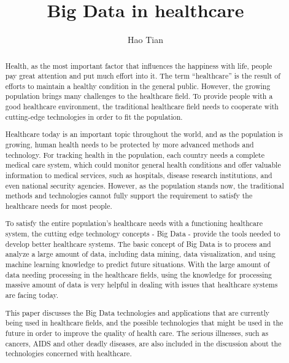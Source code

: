 
\title{Big Data in healthcare}

\author{Hao Tian}


\renewcommand{\shortauthors}{H. Tian.}


\begin{abstract}
Health, as the most important factor that influences 
the happiness with life, 
people pay great attention and put much effort into it. 
The term ``healthcare'' is the 
result of efforts to maintain a healthy condition in the 
general public. 
However, the growing population brings many challenges to 
the healthcare field. To provide people with a good  
healthcare environment, the traditional healthcare field 
needs to cooperate with 
cutting-edge technologies in order to fit the population. 

Healthcare today is an important topic throughout the world, and as 
the population is growing, human health needs 
to be protected by more advanced methods and technology. For tracking 
health in the population, each country needs a complete medical 
care system, which could monitor general health conditions and offer 
valuable information to medical services, such as 
hospitals, disease research institutions, and even national security agencies. 
However, as the population stands now, the traditional 
methods and technologies cannot fully support the requirement to
satisfy the healthcare needs for most people.

To satisfy the entire population's healthcare needs with a functioning 
healthcare system, the cutting edge technology concepts - Big Data - 
provide the tools needed to develop better healthcare systems. 
The basic concept of Big Data is to process and analyze a large amount 
of data, including data mining, data visualization, and using machine 
learning knowledge to predict  future situations. With the large amount of 
data needing processing in the healthcare fields, using the knowledge for 
processing massive amount of data is very helpful in dealing with 
issues that healthcare systems are facing today. 

This paper discusses the Big Data technologies and applications that 
are currently being used in healthcare fields, and the possible technologies 
that might be used in the future in order to improve the quality of health 
care. The serious illnesses, such as cancers, AIDS and other deadly 
diseases, are also included in the discussion about the technologies 
concerned with healthcare. 
\end{abstract} 

